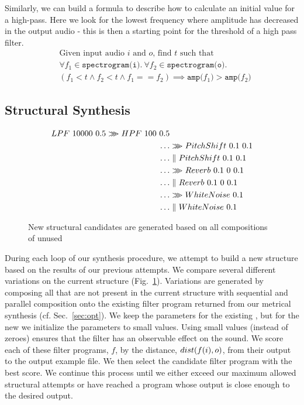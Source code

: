 Similarly, we can build a formula to describe how to calculate an initial value for a high-pass.
Here we look for the lowest frequency where amplitude has decreased in the output audio - this is then a starting point for the threshold of a high pass filter.
%
\begin{align*}
&\text{Given input audio }i\text{ and }o\text{, find }t\text{ such that} \\
&\forall f_1 \in \texttt{spectrogram(i)}.\ \forall f_2 \in \texttt{spectrogram(o)}. \\
&(f_1 < t \land f_2 < t \land f_1 == f_2) \implies \texttt{amp(}f_1\texttt{)} > \texttt{amp(} f_2 \texttt{)} 
\end{align*}


\subsection{Structural Synthesis}

\begin{figure}
\begin{align*}
	LPF \ 10000 \ 0.5 \arrComp HPF \ 100 \ 0.5 & \\
	\ldots & \arrComp PitchShift \ 0.1 \ 0.1 \\
	\ldots & \parallelCompose PitchShift \ 0.1 \ 0.1 \\
	\ldots & \arrComp Reverb \ 0.1 \ 0 \ 0.1 \\
	\ldots & \parallelCompose Reverb \ 0.1 \ 0 \ 0.1 \\
	\ldots & \arrComp WhiteNoise \ 0.1 \\
	\ldots & \parallelCompose WhiteNoise \ 0.1
\end{align*}
\caption{New structural candidates are generated based on all compositions of unused \dspnode}
\label{fig:generation}
\end{figure}

During each loop of our synthesis procedure, we attempt to build a new structure based on the results of our previous attempts.
We compare several different variations on the current structure (Fig.~\ref{fig:generation}).
Variations are generated by composing all \dspnode that are not present in the current structure with sequential and parallel composition onto the existing filter program returned from our metrical synthesis (cf. Sec.~\ref{sec:opt}).
We keep the parameters for the existing \dspnode, but for the new \dspnode we initialize the parameters to small values.
Using small values (instead of zeroes) ensures that the filter has an observable effect on the sound.
We score each of these filter programs, $f$, by the distance, $dist(f(i), o)$, from their output to the output example file.
We then select the candidate filter program with the best score.
We continue this process until we either exceed our maximum allowed structural attempts or have reached a program whose output is close enough to the desired output.
